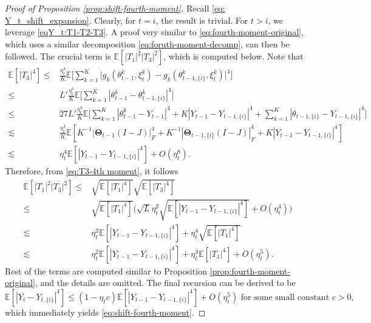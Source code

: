 \documentclass[a4paper,11pt]{article}
\numberwithin{equation}{section}
\theoremstyle{plain}
\theoremstyle{remark}
\def\IE{\mathbb{E}}
\def\bT{\mathbf{\Theta}}
\newcommand{\shift}[2]{#1_{#2, \{i\}}}
\begin{document}
\begin{proof}[Proof of Proposition \ref{prop:shift-fourth-moment}]
    Recall \eqref{eq: Y_t_shift_expansion}. Clearly, for $t=i$, the result is trivial. For $t>i$, we leverage \eqref{eqY_t:T1-T2-T3}. A proof very similar to \eqref{eq:fourth-moment-original}, which uses a similar decomposition \eqref{eq:foruth-moment-decomp}, can then be followed. The crucial term is $\IE[|T_1|^2|T_3|^2]$, which is computed below. Note that 
    \begin{align}
        \IE[|T_3|^4] \leq & \frac{\eta_t^4}{K}\IE\bigg[\sum_{k=1}^K|g_k(\theta_{t-1}^k , \xi_t^k) - g_k(\shift{\theta}{t-1}^k, \xi_t^k)\big|^4 \bigg] \nonumber\\
        \leq & L'\frac{\eta_t^4}{K}\IE\big[\sum_{k=1}^K |\theta_{t-1}^k- \shift{\theta}{t-1}^k|^4 \big]\nonumber\\
        \leq & 27L' \frac{\eta_t^4}{K}\IE\Big[ \sum_{k=1}^K |\theta_{t-1}^k- Y_{t-1}|^4 + K |Y_{t-1} -\shift{Y}{t-1}|^4+ \sum_{k=1}^K |\shift{\theta}{t-1}- \shift{Y}{t-1}|^4\Big]\nonumber\\
        \lesssim &  \frac{\eta_t^4}{K} \IE[K^{-1}|\bT_{t-1}(I-J)|_F^4 + K^{-1}|\shift{\bT}{t-1}(I-J)|_F^4 + K |Y_{t-1}-\shift{Y}{t-1}|^4] \nonumber\\
        \lesssim &  \eta_t^4\IE[|Y_{t-1}- \shift{Y}{t-1}|^4] + O(\eta_t^8). \label{eq:T3-4th moment}
    \end{align}
    Therefore, from \eqref{eq:T3-4th moment}, it follows
    \begin{align}
        \IE[|T_1|^2|T_3|^2] \leq & \sqrt{\IE[|T_1|^4]}\sqrt{\IE[|T_3|^4]}\nonumber\\
        \leq & \sqrt{\IE[|T_1|^4]} \big(\sqrt{L}{\eta_t^2}\sqrt{\IE[|Y_{t-1} - \shift{Y}{t-1}|^4]} + O({\eta_t^4})\big) \nonumber\\
        \lesssim & {\eta_t^2} \IE[|Y_{t-1}- \shift{Y}{t-1}|^4] + {\eta_t^4}\sqrt{\IE[|T_1|^4]} \nonumber\\
        \lesssim & {\eta_t^2} \IE[|Y_{t-1}- \shift{Y}{t-1}|^4] + \eta_t^3 \IE[|T_1|^4] + O({\eta_t^5}).
    \end{align}
    Rest of the terms are computed similar to Proposition \ref{prop:fourth-moment-original}, and the details are omitted. The final recursion can be derived to be 
    \[ \IE[|Y_t - \shift{Y}{t}|^4] \leq (1- \eta_tc)\IE[|Y_{t-1} - \shift{Y}{t-1}|^4] + O({\eta_t^5}) \text{ for some small constant $c>0$,} \]
which immediately yields \eqref{eq:shift-fourth-moment}.
\end{proof}
\end{document}
